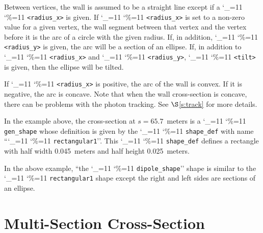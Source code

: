 \documentclass[11pt,openany]{report}
\newcommand{\sref}[1]{$\S$\ref{#1}}
\newcommand\ttcmd{\begingroup\catcode`\_=11 \catcode`\%=11 \dottcmd}
\newcommand\dottcmd[1]{\texttt{#1}\endgroup}
\newcommand{\vn}{\ttcmd}
\begin{document}
Between vertices, the wall is assumed to be a straight line except if
a \vn{<radius_x>} is given. If \vn{<radius_x>} is set to a non-zero
value for a given vertex, the wall segment between that vertex and the
vertex before it is the arc of a circle with the given radius. If, in
addition, \vn{<radius_y>} is given, the arc will be a section of an
ellipse.  If, in addition to \vn{<radius_x>} and \vn{<radius_y>},
\vn{<tilt>} is given, then the ellipse will be tilted.

If \vn{<radius_x>} is positive, the arc of the wall is convex. If it
is negative, the arc is concave. Note that when the wall cross-section
is concave, there can be problems with the photon tracking. See
\sref{s:track} for more details.

In the example above, the cross-section at $s = 65.7$~meters is a
\vn{gen_shape} whose definition is given by the \vn{shape_def}
with name ``\vn{rectangular1}''.  This \vn{shape_def} defines a rectangle
with half width 0.045~meters and half height 0.025~meters.

In the above example, ``the \vn{dipole_shape}'' shape is similar to
the \vn{rectangular1} shape except the right and left sides are
sections of an ellipse.

\section{Multi-Section Cross-Section}
\label{s:multi.sec}
\end{document}
